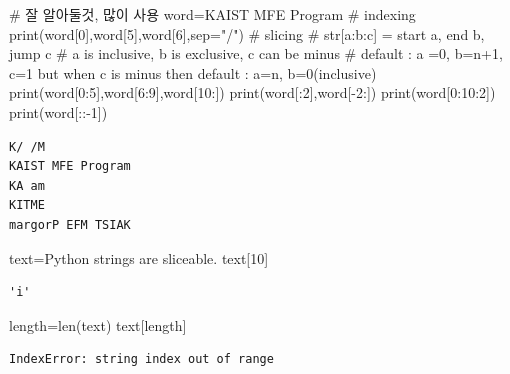 \documentclass[
  letterpaper,
  DIV=11,
  numbers=noendperiod]{scrreprt}
\newenvironment{Shaded}{\begin{snugshade}}{\end{snugshade}}
\newcommand{\BuiltInTok}[1]{\textcolor[rgb]{0.00,0.23,0.31}{#1}}
\newcommand{\CommentTok}[1]{\textcolor[rgb]{0.37,0.37,0.37}{#1}}
\newcommand{\DecValTok}[1]{\textcolor[rgb]{0.68,0.00,0.00}{#1}}
\newcommand{\NormalTok}[1]{\textcolor[rgb]{0.00,0.23,0.31}{#1}}
\newcommand{\OperatorTok}[1]{\textcolor[rgb]{0.37,0.37,0.37}{#1}}
\newcommand{\StringTok}[1]{\textcolor[rgb]{0.13,0.47,0.30}{#1}}
\begin{document}
\begin{Shaded}
\begin{Highlighting}[]
\CommentTok{\# 잘 알아둘것, 많이 사용}
\NormalTok{word}\OperatorTok{=}\StringTok{\textquotesingle{}KAIST MFE Program\textquotesingle{}}
\CommentTok{\# indexing}
\BuiltInTok{print}\NormalTok{(word[}\DecValTok{0}\NormalTok{],word[}\DecValTok{5}\NormalTok{],word[}\DecValTok{6}\NormalTok{],sep}\OperatorTok{=}\StringTok{"/"}\NormalTok{)}
\CommentTok{\# slicing}
\CommentTok{\# str[a:b:c] = start a, end b, jump c}
\CommentTok{\# a is inclusive, b is exclusive, c can be minus}
\CommentTok{\# default : a =0, b=n+1, c=1 but when c is minus then default : a=n, b=0(inclusive)}
\BuiltInTok{print}\NormalTok{(word[}\DecValTok{0}\NormalTok{:}\DecValTok{5}\NormalTok{],word[}\DecValTok{6}\NormalTok{:}\DecValTok{9}\NormalTok{],word[}\DecValTok{10}\NormalTok{:])}
\BuiltInTok{print}\NormalTok{(word[:}\DecValTok{2}\NormalTok{],word[}\OperatorTok{{-}}\DecValTok{2}\NormalTok{:])}
\BuiltInTok{print}\NormalTok{(word[}\DecValTok{0}\NormalTok{:}\DecValTok{10}\NormalTok{:}\DecValTok{2}\NormalTok{])}
\BuiltInTok{print}\NormalTok{(word[::}\OperatorTok{{-}}\DecValTok{1}\NormalTok{])}
\end{Highlighting}
\end{Shaded}

\begin{verbatim}
K/ /M
KAIST MFE Program
KA am
KITME
margorP EFM TSIAK
\end{verbatim}

\begin{Shaded}
\begin{Highlighting}[]
\NormalTok{text}\OperatorTok{=}\StringTok{\textquotesingle{}Python strings are sliceable.\textquotesingle{}}
\NormalTok{text[}\DecValTok{10}\NormalTok{]}
\end{Highlighting}
\end{Shaded}

\begin{verbatim}
'i'
\end{verbatim}

\begin{Shaded}
\begin{Highlighting}[]
\NormalTok{length}\OperatorTok{=}\BuiltInTok{len}\NormalTok{(text)}
\NormalTok{text[length]}
\end{Highlighting}
\end{Shaded}

\begin{verbatim}
IndexError: string index out of range
\end{verbatim}
\end{document}
